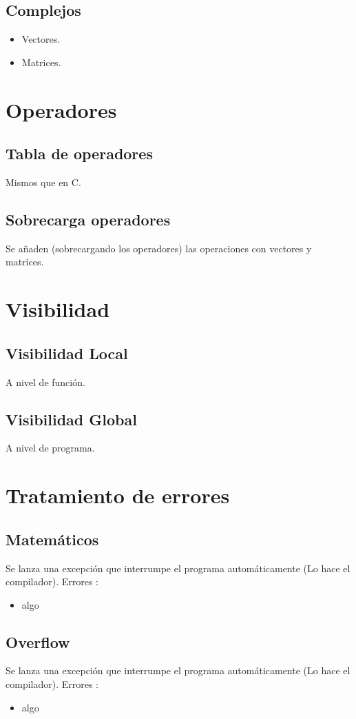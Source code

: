 \documentclass[12pt,a4paper]{article}
\begin{document}
\subsection{Complejos}
\begin{itemize}
\item Vectores.
\item Matrices.
\end{itemize}
\section{Operadores}
\subsection{Tabla de operadores}
Mismos que en C.
\subsection{Sobrecarga operadores}
Se añaden (sobrecargando los operadores) las operaciones con vectores y matrices.
\section{Visibilidad}
\subsection{Visibilidad Local}
A nivel de función.
\subsection{Visibilidad Global}
A nivel de programa.
\section{Tratamiento de errores}
\subsection{Matemáticos}
Se lanza una excepción que interrumpe el programa automáticamente (Lo hace el compilador).
Errores :
\begin{itemize}
\item algo
\end{itemize}
\subsection{Overflow}
Se lanza una excepción que interrumpe el programa automáticamente (Lo hace el compilador).
Errores :
\begin{itemize}
\item algo
\end{itemize}
\end{document}
